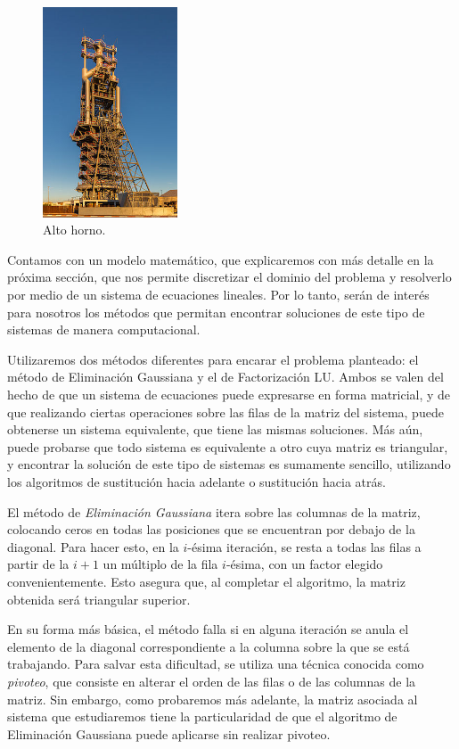 \documentclass[11pt, a4paper, spanish]{article}
\theoremstyle{plain}
\theoremstyle{remark}
\begin{document}
  \begin{figure}[h]
    \centering
    \includegraphics[width=4cm]{altoHorno.jpg}
    \caption{Alto horno.}
  \end{figure}

  Contamos con un modelo matemático, que explicaremos con más detalle en la próxima sección, que nos permite discretizar el dominio del problema y resolverlo por medio de un sistema de ecuaciones lineales. Por lo tanto, serán de interés para nosotros los métodos que permitan encontrar soluciones de este tipo de sistemas de manera computacional.

  Utilizaremos dos métodos diferentes para encarar el problema planteado: el método de Eliminación Gaussiana y el de Factorización LU. Ambos se valen del hecho de que un sistema de ecuaciones puede expresarse en forma matricial, y de que realizando ciertas operaciones sobre las filas de la matriz del sistema, puede obtenerse un sistema equivalente, que tiene las mismas soluciones. Más aún, puede probarse que todo sistema es equivalente a otro cuya matriz es triangular, y encontrar la solución de este tipo de sistemas es sumamente sencillo, utilizando los algoritmos de sustitución hacia adelante o sustitución hacia atrás.

  El método de \emph{Eliminación Gaussiana} itera sobre las columnas de la matriz, colocando ceros en todas las posiciones que se encuentran por debajo de la diagonal. Para hacer esto, en la $i$-ésima iteración, se resta a todas las filas a partir de la $i + 1$ un múltiplo de la fila $i$-ésima, con un factor elegido convenientemente. Esto asegura que, al completar el algoritmo, la matriz obtenida será triangular superior.

  En su forma más básica, el método falla si en alguna iteración se anula el elemento de la diagonal correspondiente a la columna sobre la que se está trabajando. Para salvar esta dificultad, se utiliza una técnica conocida como \emph{pivoteo}, que consiste en alterar el orden de las filas o de las columnas de la matriz. Sin embargo, como probaremos más adelante, la matriz asociada al sistema que estudiaremos tiene la particularidad de que el algoritmo de Eliminación Gaussiana puede aplicarse sin realizar pivoteo.
\end{document}

